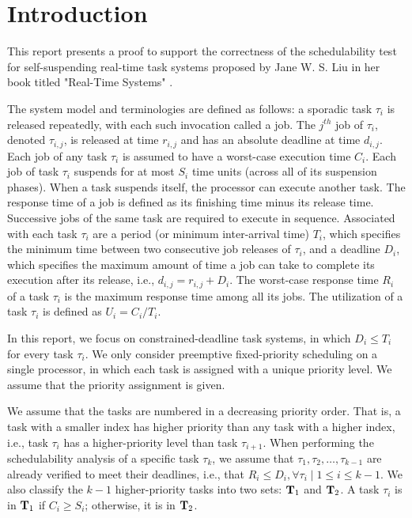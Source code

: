 \section{Introduction}

This report presents a proof to support the correctness of the
schedulability test for self-suspending real-time task systems proposed by Jane
W. S. Liu in her book titled "Real-Time Systems" \cite{Liu:2000:RS:518501}.

The system model and terminologies are defined as follows:  a sporadic task
$\tau_i$ is released repeatedly, with each such invocation called a
job. The $j^{th}$ job of $\tau_i$, denoted $\tau_{i,j}$, is released
at time $r_{i,j}$ and has an absolute deadline at time $d_{i,j}$. Each
job of any task $\tau_i$ is assumed to have a worst-case execution time $C_i$. Each job of task $\tau_i$ 
suspends for at most $S_i$ time units (across all of its suspension phases). When a task suspends itself, 
the processor can execute another task. 
The response time
of a job is defined as its finishing time minus its release
time. Successive jobs of the same task are required to execute in
sequence. Associated with each task $\tau_i$ are a period (or minimum inter-arrival time) $T_i$, which
specifies the minimum time between two consecutive job releases of
$\tau_i$, and a deadline $D_i$, which specifies the maximum amount of time a job can take to complete its execution after its release, i.e., $d_{i,j}=r_{i,j}+D_i$. The worst-case response
time $R_i$ of a task $\tau_i$ is the maximum response time among all its
jobs.  The utilization of a task $\tau_i$ is defined as $U_i=C_i/T_i$.

In this report, we focus on constrained-deadline task systems, in which $D_i \leq T_i$ for every task $\tau_i$. We only consider preemptive fixed-priority scheduling on a single processor, in which each task is assigned with a unique priority level. We assume that the priority assignment is given.

We assume that the tasks are numbered in a decreasing priority order. That is, a task with a smaller index has higher priority than any task with a higher index, i.e., task $\tau_i$ has a higher-priority level than task $\tau_{i+1}$. When performing the schedulability analysis of a specific task $\tau_k$, we assume that $\tau_1, \tau_2, \ldots, \tau_{k-1}$ are already verified to meet their deadlines, i.e., that $R_i \leq D_i, \forall \tau_i \mid 1 \leq i \leq k-1$. We also classify the $k-1$ higher-priority tasks into two sets: ${\bf T}_1$ and ${\bf T}_2$. A task $\tau_i$ is in ${\bf T}_1$ if $C_i \geq S_i$; otherwise, it is in ${\bf T}_2$. 

